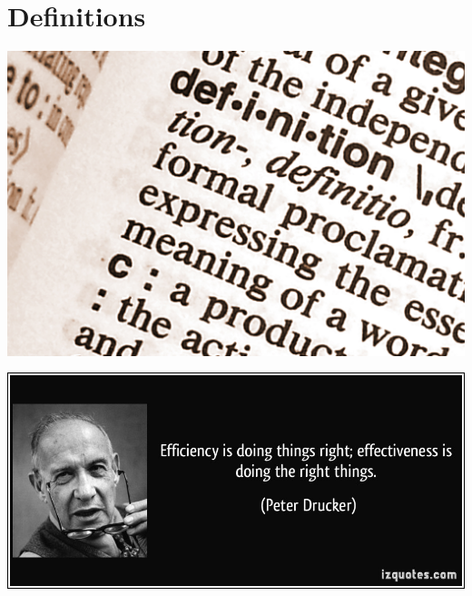 \documentclass[14pt]{beamer}
\begin{document}
\section{Definitions}
\begin{frame}
\includegraphics[width=\textwidth]{definition}
\end{frame}

\begin{frame}
\includegraphics[width=\textwidth]{quote-efficiency-is-doing-things-right-effectiveness-is-doing-the-right-things-peter-drucker-53210}
\end{frame}
\end{document}
